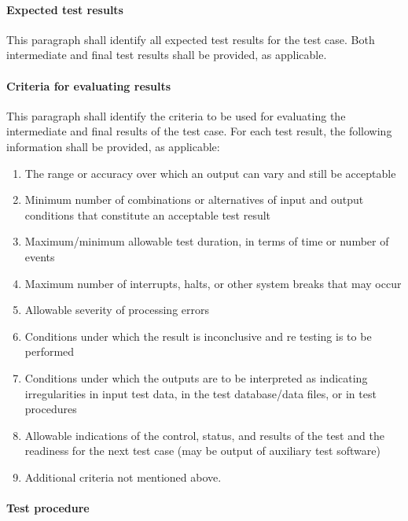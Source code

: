 \documentclass{fidata-report-template}
\begin{document}
\paragraph{Expected test results}

This paragraph shall identify all expected test results for the test
case. Both intermediate and final test results shall be provided, as
applicable.

\paragraph{Criteria for evaluating results}

This paragraph shall identify the criteria to be used for evaluating the
intermediate and final results of the test case. For each test result,
the following information shall be provided, as applicable:

\begin{enumerate}
\itemsep1pt\parskip0pt
\item
  The range or accuracy over which an output can vary and still be
  acceptable
\item
  Minimum number of combinations or alternatives of input and output
  conditions that constitute an acceptable test result
\item
  Maximum/minimum allowable test duration, in terms of time or number of
  events
\item
  Maximum number of interrupts, halts, or other system breaks that may
  occur
\item
  Allowable severity of processing errors
\item
  Conditions under which the result is inconclusive and re testing is to
  be performed
\item
  Conditions under which the outputs are to be interpreted as indicating
  irregularities in input test data, in the test database/data files, or
  in test procedures
\item
  Allowable indications of the control, status, and results of the test
  and the readiness for the next test case (may be output of auxiliary
  test software)
\item
  Additional criteria not mentioned above.
\end{enumerate}

\paragraph{Test procedure}
\end{document}
